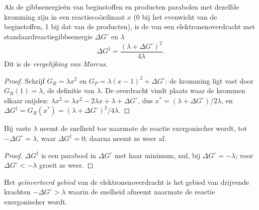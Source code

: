 \begin{theorem}\label{thm:b3:complex-mechanisms:marcus}
Als de gibbsenergieën van beginstoffen en producten parabolen met
dezelfde kromming zijn in een reactiecoördinaat $x$ (0 bij het evenwicht van de beginstoffen, 1 bij dat
van de producten), is de  van een
elektronenoverdracht met
standaardreactiegibbsenergie $\Delta G^\circ$ en  $\lambda$
\[
  \Delta G^{\ddagger} = \frac{(\lambda + \Delta G^\circ)^2}{4\lambda} .
\]
Dit is de \emph{vergelijking van Marcus}.
\end{theorem}

\begin{proof}
Schrijf $G_R = \lambda x^2$ en $G_P = \lambda(x - 1)^2 + \Delta G^\circ$: de kromming ligt vast door $G_R(1) = \lambda$, de
definitie van $\lambda$. De overdracht vindt plaats waar de krommen elkaar snijden: $\lambda x^2 = \lambda x^2 - 2\lambda x + \lambda +
\Delta G^\circ$, dus $x^\ast = (\lambda + \Delta G^\circ)/2\lambda$, en $\Delta G^{\ddagger} = G_R(x^\ast) = (\lambda + \Delta G^\circ)^2/4\lambda$.
\end{proof}

\begin{corollary}\label{cor:b3:complex-mechanisms:inverted}
Bij vaste $\lambda$ neemt de snelheid toe naarmate de reactie exergonischer wordt, tot
$-\Delta G^\circ = \lambda$, waar $\Delta G^{\ddagger} = 0$; daarna neemt ze weer af.
\end{corollary}

\begin{proof}
$\Delta G^{\ddagger}$ is een parabool in $\Delta G^\circ$ met haar minimum, nul, bij $\Delta G^\circ = -\lambda$; voor $\Delta G^\circ < -\lambda$ groeit ze
weer.
\end{proof}

\begin{definition}\label{def:b3:complex-mechanisms:inverted}
Het \emph{geïnverteerd gebied}
van de elektronenoverdracht is het gebied van drijvende krachten $-\Delta G^\circ > \lambda$ waarin de snelheid afneemt naarmate de reactie
exergonischer wordt.
\end{definition}

